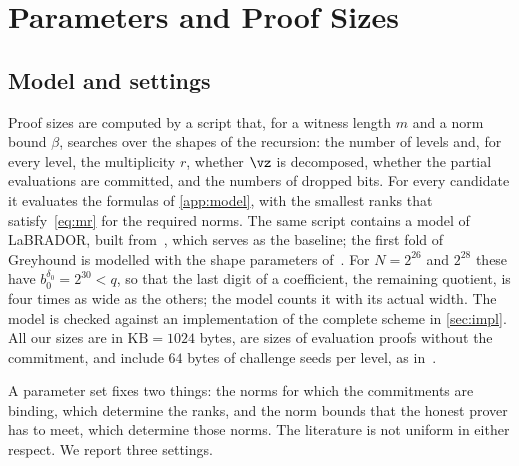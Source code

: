 \section{Parameters and Proof Sizes}\label{sec:eval}

\subsection{Model and settings}\label{sec:model}

Proof sizes are computed by a script that, for a witness length $m$ and a norm bound $\beta$, searches over the shapes of the recursion: the number of levels and, for every level, the multiplicity $r$, whether $\vz$ is decomposed, whether the partial evaluations are committed, and the numbers of dropped bits. For every candidate it evaluates the formulas of \cref{app:model}, with the smallest ranks that satisfy~\eqref{eq:mr} for the required norms. The same script contains a model of LaBRADOR, built from~\cite[Section~5]{BS23}, which serves as the baseline; the first fold of Greyhound is modelled with the shape parameters of~\cite[Table~4]{NS24}. For $N=2^{26}$ and $2^{28}$ these have $b_0^{\delta_0}=2^{30}<q$, so that the last digit of a coefficient, the remaining quotient, is four times as wide as the others; the model counts it with its actual width. The model is checked against an implementation of the complete scheme in \cref{sec:impl}. All our sizes are in $\mathrm{KB}=1024$ bytes, are sizes of evaluation proofs without the commitment, and include $64$ bytes of challenge seeds per level, as in~\cite{BS23}.

A parameter set fixes two things: the norms for which the commitments are binding, which determine the ranks, and the norm bounds that the honest prover has to meet, which determine those norms. The literature is not uniform in either respect. We report three settings.

